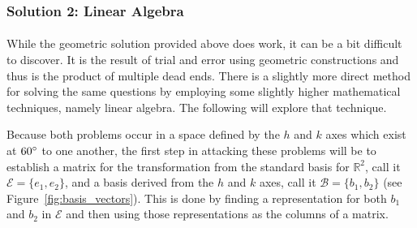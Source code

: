 \documentclass[12pt,letter]{article}
\begin{document}
\subsubsection{Solution 2: Linear Algebra} %
\paragraph{}
While the geometric solution provided above does work, it can be a bit difficult to discover. It is the result of trial and error using geometric constructions and thus is the product of multiple dead ends. There is a slightly more direct method for solving the same questions by employing some slightly higher mathematical techniques, namely linear algebra. The following will explore that technique.

Because both problems occur in a space defined by the $h$ and $k$ axes which exist at $60\degree$ to one another, the first step in attacking these problems will be to establish a matrix for the transformation from the standard basis for $\mathbb{R}^2$, call it $\mathcal{E} = \{e_1,e_2\}$, and a basis derived from the $h$ and $k$ axes, call it $\mathcal{B} = \{b_1, b_2\}$ (see Figure~\ref{fig:basis_vectors}). This is done by finding a representation for both $b_1$ and $b_2$ in $\mathcal{E}$ and then using those representations as the columns of a matrix. 
\end{document}
